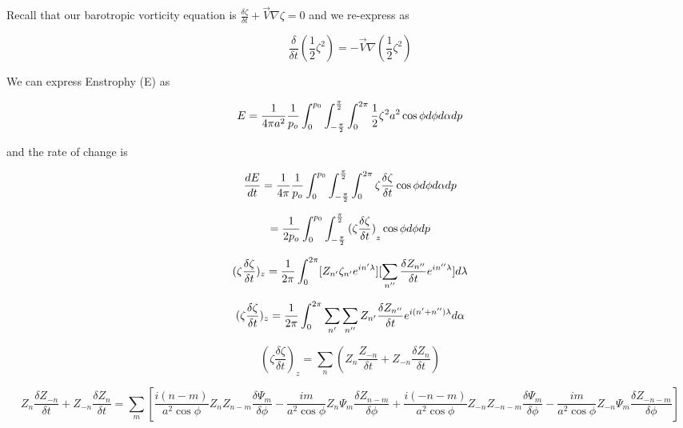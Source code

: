 \documentclass{article}
\begin{document}
Recall that our barotropic vorticity equation is $\frac{\delta \zeta}{\delta t} + \vec{V} \nabla {\zeta} = 0$ and we re-express as

\begin{equation}
\frac{\delta}{\delta t} (\frac{1}{2} \zeta^2 ) = - \vec{V} \nabla (\frac{1}{2} \zeta^2 )
\end{equation}

We can express Enstrophy (E) as 

\begin{equation}
E = \frac{1}{4\pi a^2} \frac{1}{p_o} \int_{0}^{p_0} \int_{-\frac{\pi}{2}}^{\frac{\pi}{2}} \int_{0}^{2\pi} \frac{1}{2} \zeta^2 a^2 \cos{\phi} d\phi d\alpha dp
\end{equation}

and the rate of change is 

\begin{equation}
\frac{dE}{dt} = \frac{1}{4\pi} \frac{1}{p_o} \int_{0}^{p_0} \int_{-\frac{\pi}{2}}^{\frac{\pi}{2}} \int_{0}^{2\pi} \zeta \frac{\delta \zeta}{\delta t} \cos{\phi} d\phi d\alpha dp
\end{equation}

\begin{equation}
= \frac{1}{2 p_o} \int_{0}^{p_0} \int_{-\frac{\pi}{2}}^{\frac{\pi}{2}} {(\zeta \frac{\delta \zeta}{\delta t})}_z \cos{\phi} d\phi dp
\end{equation}

\begin{equation}
(\zeta \frac{\delta \zeta}{\delta t})_z = \frac{1}{2\pi} \int_{0}^{2\pi} [ Z_{n'} \zeta_{n'} e^{in'\lambda} ] [ \sum_{n''} \frac{\delta Z_{n''}}{\delta t} e^{in''\lambda} ] d\lambda
\end{equation}

\begin{equation}
(\zeta \frac{\delta \zeta}{\delta t})_z = \frac{1}{2\pi} \int_{0}^{2\pi} \sum_{n'} \sum_{n''} Z_{n'} \frac{\delta Z_{n''}}{\delta t} e^{i(n'+n'')\lambda} d\alpha
\end{equation}

\begin{equation}
(\zeta \frac{\delta \zeta}{\delta t})_z = \sum_n (Z_n \frac{Z_{-n}}{\delta t} + Z_{-n} \frac{\delta Z_n}{\delta t} )
\end{equation}

\begin{equation}
Z_n \frac{\delta Z_{-n}}{\delta t} + Z_{-n} \frac{\delta Z_n}{\delta t} = \sum_m [ \frac{i(n-m)}{a^2 \cos{\phi}} Z_n Z_{n-m} \frac{\delta \Psi_m}{\delta \phi} - \frac{im}{a^2 \cos{\phi}} Z_n \Psi_m \frac{\delta Z_{n-m}}{\delta \phi} + \frac{i(-n-m)}{a^2 \cos{\phi}} Z_{-n} Z_{-n-m} \frac{\delta \Psi_m}{\delta \phi} - \frac{im}{a^2 \cos{\phi}} Z_{-n} \Psi_m \frac{\delta Z_{-n-m}}{\delta \phi} ]
\end{equation}
\end{document}
